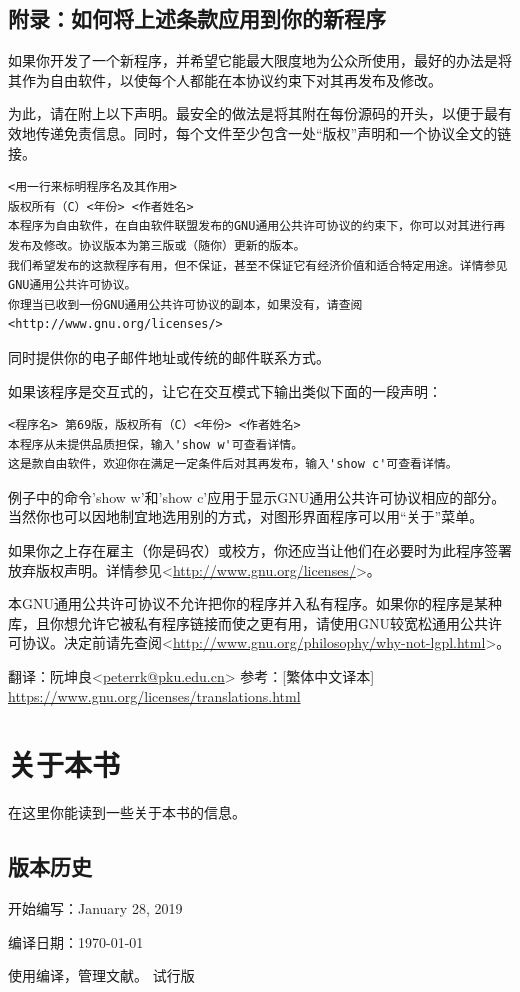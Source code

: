 \subsection{附录：如何将上述条款应用到你的新程序}
如果你开发了一个新程序，并希望它能最大限度地为公众所使用，最好的办法是将其作为自由软件，以使每个人都能在本协议约束下对其再发布及修改。\par
为此，请在附上以下声明。最安全的做法是将其附在每份源码的开头，以便于最有效地传递免责信息。同时，每个文件至少包含一处“版权”声明和一个协议全文的链接。
\begin{verbatim}
<用一行来标明程序名及其作用>
版权所有（C）<年份> <作者姓名>
本程序为自由软件，在自由软件联盟发布的GNU通用公共许可协议的约束下，你可以对其进行再发布及修改。协议版本为第三版或（随你）更新的版本。
我们希望发布的这款程序有用，但不保证，甚至不保证它有经济价值和适合特定用途。详情参见GNU通用公共许可协议。
你理当已收到一份GNU通用公共许可协议的副本，如果没有，请查阅
<http://www.gnu.org/licenses/>
\end{verbatim}\par
同时提供你的电子邮件地址或传统的邮件联系方式。\par
如果该程序是交互式的，让它在交互模式下输出类似下面的一段声明：
\begin{verbatim}
<程序名> 第69版，版权所有（C）<年份> <作者姓名>
本程序从未提供品质担保，输入'show w'可查看详情。
这是款自由软件，欢迎你在满足一定条件后对其再发布，输入'show c'可查看详情。
\end{verbatim}\par
例子中的命令'show w'和'show c'应用于显示GNU通用公共许可协议相应的部分。当然你也可以因地制宜地选用别的方式，对图形界面程序可以用“关于”菜单。\par
如果你之上存在雇主（你是码农）或校方，你还应当让他们在必要时为此程序签署放弃版权声明。详情参见<\url{http://www.gnu.org/licenses/}>。\par
本GNU通用公共许可协议不允许把你的程序并入私有程序。如果你的程序是某种库，且你想允许它被私有程序链接而使之更有用，请使用GNU较宽松通用公共许可协议。决定前请先查阅<\url{http://www.gnu.org/philosophy/why-not-lgpl.html}>。\par
翻译：阮坤良<\url{peterrk@pku.edu.cn}>
参考：[繁体中文译本] \url{https://www.gnu.org/licenses/translations.html}
\section{关于本书}
在这里你能读到一些关于本书的信息。
\subsection{版本历史}
开始编写：January 28, 2019\par
编译日期：\today \par
使用\XeLaTeX 编译，\BIBTEX 管理文献。
试行版
